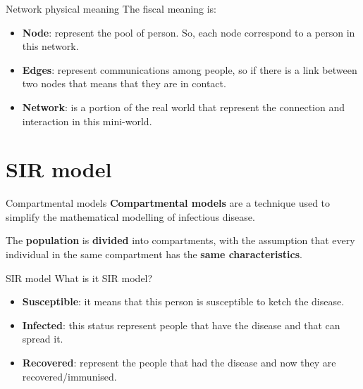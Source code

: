 \documentclass{beamer}
\begin{document}
	\begin{frame}{Network physical meaning}
	    The fiscal meaning is:
		\begin{itemize}[<+->]
		    \item \textbf{Node}: represent the pool of person. So, each node correspond to a person in this network.
		    \item \textbf{Edges}: represent communications among people, so if there is a link between two nodes that means that they are in contact.
		    \item \textbf{Network}: is a portion of the real world that represent the connection and interaction in this mini-world.
		\end{itemize}
		\begin{left}
		\end{left}
	\end{frame}



	\section{SIR model}
	
	\begin{frame}{Compartmental models}
	    \textbf{Compartmental models} are a technique used to simplify the mathematical modelling of infectious disease.
	    
	    The \textbf{population} is \textbf{divided} into compartments, with the assumption that every individual in the same compartment has the \textbf{same characteristics}.
	\end{frame}
	
	\begin{frame}{SIR model}
	    What is it SIR model?
	    \begin{center}
		\end{center}
		\begin{itemize}\footnotesize
		    \item \textbf{Susceptible}: it means that this person is susceptible to ketch the disease.
		    \item \textbf{Infected}: this status represent people that have the disease and that can spread it.
		    \item \textbf{Recovered}: represent the people that had the disease and now they are recovered/immunised.
		\end{itemize}
	\end{frame}
	
\end{document}
